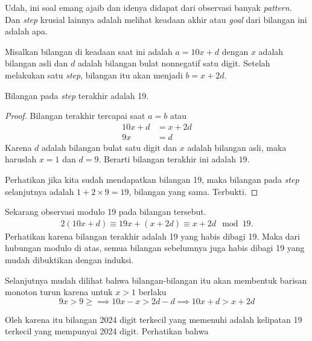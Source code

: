 
\begin{solusi}
    \begin{remark*}[Motivasi]
        Udah, ini soal emang ajaib dan idenya didapat dari observasi banyak \textit{pattern}. Dan \textit{step} krusial lainnya adalah melihat keadaan akhir atau \textit{goal} dari bilangan ini adalah apa.
    \end{remark*}
    Misalkan bilangan di keadaan saat ini adalah $a=10x+d$ dengan $x$ adalah bilangan asli dan $d$ adalah bilangan bulat nonnegatif satu digit. Setelah melakukan satu \textit{step}, bilangan itu akan menjadi $b=x+2d$.

    \begin{lemma*}
        Bilangan pada \textit{step} terakhir adalah 19.
        \begin{proof}
            Bilangan terakhir tercapai saat $a=b$ atau
            \begin{align*}
                10x+d &= x+2d\\
                9x &= d
            \end{align*}
            Karena $d$ adalah bilangan bulat satu digit dan $x$ adalah bilangan asli, maka haruslah $x=1$ dan $d=9$. Berarti bilangan terakhir ini adalah $19$.
            
            Perhatikan jika kita sudah mendapatkan bilangan 19, maka bilangan pada \textit{step} selanjutnya adalah $1+2\times 9 = 19$, bilangan yang sama. Terbukti.
        \end{proof}
    \end{lemma*}

    Sekarang observasi modulo 19 pada bilangan tersebut.
    \begin{align*}
        2(10x+d) \equiv 19x + (x+2d) \equiv x+2d \mod 19.
    \end{align*}
    Perhatikan karena bilangan terakhir adalah 19 yang habis dibagi 19. Maka dari hubungan modulo di atas, semua bilangan sebelumnya juga habis dibagi 19 yang mudah dibuktikan dengan induksi.

    Selanjutnya mudah dilihat bahwa bilangan-bilangan itu akan membentuk barisan monoton turun karena untuk $x>1$ berlaku
    $$9x > 9 \ge \implies 10x-x > 2d - d \implies 10x+d > x+2d$$

    Oleh karena itu bilangan 2024 digit terkecil yang memenuhi adalah kelipatan 19 terkecil yang mempunyai 2024 digit. Perhatikan bahwa


\end{solusi}

